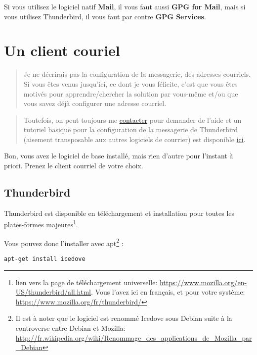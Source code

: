 Si vous utilisez le logiciel natif \textbf{Mail}, il vous faut aussi
\textbf{GPG for Mail}, mais si vous utilisez Thunderbird, il vous faut
par contre \textbf{GPG Services}.

\section{Un client couriel}\label{un-client-couriel}

\begin{quote}
Je ne décrirais pas la configuration de la messagerie, des adresses
courriels.\\Si vous êtes venus jusqu'ici, ce dont je vous félicite,
c'est que vous êtes motivés pour apprendre/chercher la solution par
vous-même et/ou que vous savez déjà configurer une adresse courriel.
\end{quote}

\begin{quote}
Toutefois, on peut toujours me
\href{\{filename\}../pages/contact-fr.md}{contacter} pour demander de
l'aide et un tutoriel basique pour la configuration de la messagerie de
Thunderbird (aisement transposable aux autres logiciels de courrier) est
disponible
\href{http://www.astucesinternet.com/modules/news/article.php?storyid=180}{ici}.
\end{quote}

Bon, vous avez le logiciel de base installé, mais rien d'autre pour
l'instant à priori. Prenez le client courriel de votre choix.

\subsection{Thunderbird}\label{thunderbird}

Thunderbird est disponible en téléchargement et installation pour toutes
les plates-formes majeures\footnote{lien vers la page de téléchargement universelle: \url{https://www.mozilla.org/en-US/thunderbird/all.html}.
	Vous l'avez ici en français, et pour votre système: \url{https://www.mozilla.org/fr/thunderbird/}}.

Vous pouvez donc l'installer avec apt\footnote{Il est à noter que le logiciel est renommé Icedove sous Debian suite à la
	controverse entre Debian et Mozilla: \url{http://fr.wikipedia.org/wiki/Renommage_des_applications_de_Mozilla_par_Debian}} :

\begin{lstlisting}
apt-get install icedove
\end{lstlisting}

